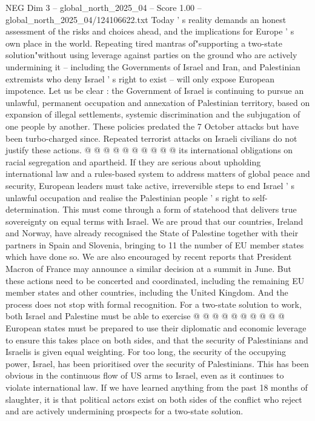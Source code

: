 \begin{textsample}{NEG Dim 3 – global\_north\_2025\_04 – Score 1.00 – global\_north\_2025\_04/124106622.txt}
Today ' s reality demands an honest assessment of the risks and choices ahead, and the implications for Europe ' s own place in the world.
Repeating tired mantras of"supporting a two-state solution"without using leverage against parties on the ground who are actively undermining it -- including the Governments of Israel and Iran, and Palestinian extremists who deny Israel ' s right to exist -- will only expose European impotence.
Let us be clear : the Government of Israel is continuing to pursue an unlawful, permanent occupation and annexation of Palestinian territory, based on expansion of illegal settlements, systemic discrimination and the subjugation of one people by another.
These policies predated the 7 October attacks but have been turbo-charged since.
Repeated terrorist attacks on Israeli civilians do not justify these actions. @ @ @ @ @ @ @ @ @ @ its international obligations on racial segregation and apartheid.
If they are serious about upholding international law and a rules-based system to address matters of global peace and security, European leaders must take active, irreversible steps to end Israel ' s unlawful occupation and realise the Palestinian people ' s right to self-determination.
This must come through a form of statehood that delivers true sovereignty on equal terms with Israel.
We are proud that our countries, Ireland and Norway, have already recognised the State of Palestine together with their partners in Spain and Slovenia, bringing to 11 the number of EU member states which have done so.
We are also encouraged by recent reports that President Macron of France may announce a similar decision at a summit in June.
But these actions need to be concerted and coordinated, including the remaining EU member states and other countries, including the United Kingdom.
And the process does not stop with formal recognition.
For a two-state solution to work, both Israel and Palestine must be able to exercise @ @ @ @ @ @ @ @ @ @ European states must be prepared to use their diplomatic and economic leverage to ensure this takes place on both sides, and that the security of Palestinians and Israelis is given equal weighting.
For too long, the security of the occupying power, Israel, has been prioritised over the security of Palestinians.
This has been obvious in the continuous flow of US arms to Israel, even as it continues to violate international law.
If we have learned anything from the past 18 months of slaughter, it is that political actors exist on both sides of the conflict who reject and are actively undermining prospects for a two-state solution.

\end{textsample}
